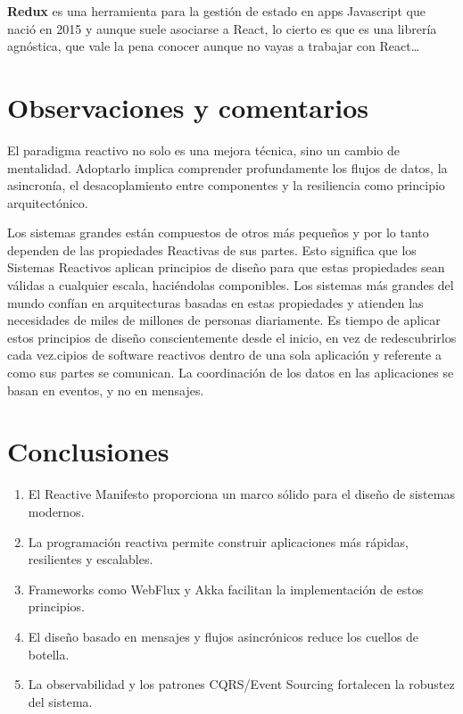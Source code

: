 \documentclass[12pt]{article}
\begin{document}
\textbf{Redux} es una herramienta para la gestión de estado en apps Javascript que nació en 2015 y aunque suele asociarse a React, lo cierto es que es una librería agnóstica, que vale la pena conocer aunque no vayas a trabajar con React…

\section*{Observaciones y comentarios}
El paradigma reactivo no solo es una mejora técnica, sino un cambio de mentalidad. Adoptarlo implica comprender profundamente los flujos de datos, la asincronía, el desacoplamiento entre componentes y la resiliencia como principio arquitectónico.

Los sistemas grandes están compuestos de otros más pequeños y por lo tanto dependen de las propiedades Reactivas de sus partes. Esto significa que los Sistemas Reactivos aplican principios de diseño para que estas propiedades sean válidas a cualquier escala, haciéndolas componibles. Los sistemas más grandes del mundo confían en arquitecturas basadas en estas propiedades y atienden las necesidades de miles de millones de personas diariamente. Es tiempo de aplicar estos principios de diseño conscientemente desde el inicio, en vez de redescubrirlos cada vez.cipios de software reactivos dentro de una sola aplicación y referente a como sus partes se comunican. La coordinación de los datos en las aplicaciones se basan en eventos, y no en mensajes.

\section*{Conclusiones}
\begin{enumerate}
    \item El Reactive Manifesto proporciona un marco sólido para el diseño de sistemas modernos.
    \item La programación reactiva permite construir aplicaciones más rápidas, resilientes y escalables.
    \item Frameworks como WebFlux y Akka facilitan la implementación de estos principios.
    \item El diseño basado en mensajes y flujos asincrónicos reduce los cuellos de botella.
    \item La observabilidad y los patrones CQRS/Event Sourcing fortalecen la robustez del sistema.
\end{enumerate}
\end{document}
